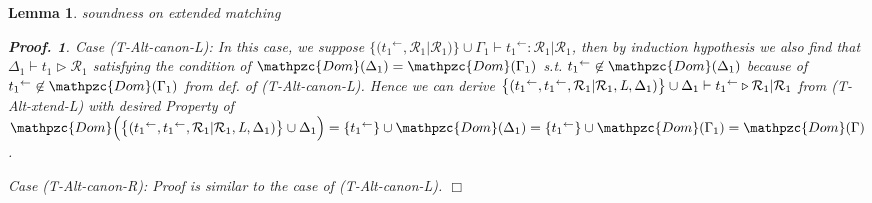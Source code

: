 \documentclass[12pt]{article}
\newtheorem{Lemma}{Lemma}[section]
\newtheorem{Proof}{Proof.}
\begin{document}
\begin{Lemma}{soundness on extended matching}
\begin{Proof}
    Case (T-Alt-canon-L): In this case, we suppose
    $\bigl\{({t_1}^\leftarrow, \mathcal{R}_1 | \mathcal{R}_1) \bigr\} \cup
    \Gamma_1 \vdash {t_1}^\leftarrow: \mathcal{R}_1 | \mathcal{R}_1$, then
    by induction hypothesis we also find that
    $\Delta_1 \vdash t_1 \triangleright \mathcal{R}_1$ satisfying the
    condition of $\mathpzc{Dom}(\Delta_1) = \mathpzc{Dom}(\Gamma_1)$ s.t.
    ${t_1}^\leftarrow \not\in \mathpzc{Dom}(\Delta_1)$ because of
    ${t_1}^\leftarrow \not\in \mathpzc{Dom}(\Gamma_1)$ from
    def. of (T-Alt-canon-L). Hence we can derive
    $\bigl\{({t_1}^\leftarrow, {t_1}^\leftarrow,
    \mathcal{R}_1 | \mathcal{R}_1, \text{\it L}, \Delta_1) \bigr\} \cup
    \Delta_1 \vdash {t_1}^\leftarrow \triangleright
    \mathcal{R}_1 | \mathcal{R}_1$ from (T-Alt-xtend-L) with desired
    Property of
    $\mathpzc{Dom}\Bigl(\bigl\{({t_1}^\leftarrow, {t_1}^\leftarrow,
    \mathcal{R}_1 | \mathcal{R}_1, \text{\it L}, \Delta_1) \bigr\} \cup
    \Delta_1 \Bigr) =
    \{{t_1}^\leftarrow\} \cup \mathpzc{Dom}(\Delta_1) =
    \{{t_1}^\leftarrow\} \cup \mathpzc{Dom}(\Gamma_1) =
    \mathpzc{Dom}(\Gamma)$.

    Case (T-Alt-canon-R): Proof is similar to the case of (T-Alt-canon-L).
    $\Box$
  \end{Proof}      
\end{Lemma}
\end{document}
